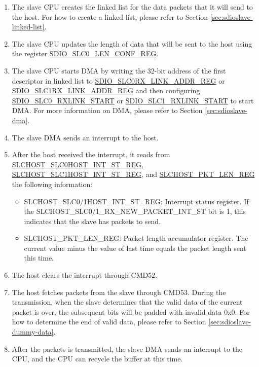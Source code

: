 \documentclass[main\_\_EN.tex]{subfiles}
\begin{document}
\begin{enumerate}
    \item The slave CPU creates the linked list for the data packets that it will send to the host. For how to create a linked list, please refer to Section \ref{sec:sdioslave-linked-list}.
    \item The slave CPU updates the length of data that will be sent to the host using the register \hyperref[regdesc:SDIOSLC0LENCONFREG]{SDIO\_SLC0\_LEN\_CONF\_REG}.
    \item The slave CPU starts DMA by writing the 32-bit address of the first descriptor in linked list to \hyperref[regdesc:SDIOSLC0RXLINKADDRREG]{SDIO\_SLC0RX\_LINK\_ADDR\_REG} or \hyperref[regdesc:SDIOSLC1RXLINKADDRREG]{SDIO\_SLC1RX\_LINK\_ADDR\_REG} and then configuring \hyperref[fielddesc:SDIOSLC0RXLINKSTART]{SDIO\_SLC0\_RXLINK\_START} or \hyperref[fielddesc:SDIOSLC1RXLINKSTART]{SDIO\_SLC1\_RXLINK\_START} to start DMA. For more information on DMA, please refer to Section \ref{sec:sdioslave-dma}.
    \item The slave DMA sends an interrupt to the host.
    \item After the host received the interrupt, it reads from \hyperref[regdesc:SLCHOSTSLC0HOSTINTSTREG]{SLCHOST\_SLC0HOST\_INT\_ST\_REG}, \hyperref[regdesc:SLCHOSTSLC1HOSTINTSTREG]{SLCHOST\_SLC1HOST\_INT\_ST\_REG}, and \hyperref[regdesc:SLCHOSTPKTLENREG]{SLCHOST\_PKT\_LEN\_REG} the following information:
    \begin{itemize}
        \item SLCHOST\_SLC0/1HOST\_INT\_ST\_REG: Interrupt status register. If the SLCHOST\_SLC0/1\_RX\_NEW\_PACKET\_INT\_ST bit is 1, this indicates that the slave has packets to send.
        \item SLCHOST\_PKT\_LEN\_REG: Packet length accumulator register. The current value minus the value of last time equals the packet length sent this time.
    \end{itemize}  
    \item The host clears the interrupt through CMD52.
    \item The host fetches packets from the slave through CMD53. During the transmission, when the slave determines that the valid data of the current packet is over, the subsequent bits will be padded with invalid data 0x0. For how to determine the end of valid data, please refer to Section \ref{sec:sdioslave-dummy-data}.
    \item After the packets is transmitted, the slave DMA sends an interrupt to the CPU, and the CPU can recycle the buffer at this time.
\end{enumerate}
\end{document}
